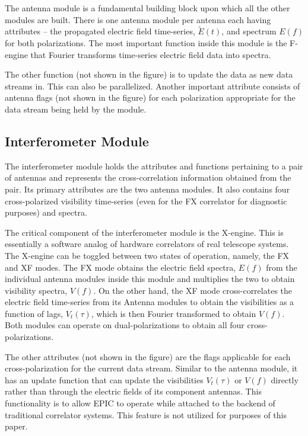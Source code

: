 \documentclass[a4paper,fleqn,usenatbib]{mnras}
\begin{document}
The antenna module is a fundamental building block upon which all the other modules are built. There is one antenna module per antenna each having attributes -- the propagated electric field time-series, $\widetilde{E}(t)$, and spectrum $E(f)$ for both polarizations. The most important function inside this module is the F-engine that Fourier transforms time-series electric field data into spectra. 

The other function (not shown in the figure) is to update the data as new data streams in. This can also be parallelized. Another important attribute consists of antenna flags (not shown in the figure) for each polarization appropriate for the data stream being held by the module. 

\subsection{Interferometer Module}

The interferometer module holds the attributes and functions pertaining to a pair of antennas and represents the cross-correlation information obtained from the pair. Its primary attributes are the two antenna modules. It also contains four cross-polarized visibility time-series (even for the FX correlator for diagnostic purposes) and spectra. 

The critical component of the interferometer module is the X-engine. This is essentially a software analog of hardware correlators of real telescope systems. The X-engine can be toggled between two states of operation, namely, the FX and XF modes. The FX mode obtains the electric field spectra, $E(f)$ from the individual antenna modules inside this module and multiplies the two to obtain visibility spectra, $V(f)$. On the other hand, the XF mode cross-correlates the electric field time-series from its Antenna modules to obtain the visibilities as a function of lags, $V_t(\tau)$, which is then Fourier transformed to obtain $V(f)$. Both modules can operate on dual-polarizations to obtain all four cross-polarizations.

The other attributes (not shown in the figure) are the flags applicable for each cross-polarization for the current data stream. Similar to the antenna module, it has an update function that can update the visibilities $V_t(\tau)$ or $V(f)$ directly rather than through the electric fields of its component antennas. This functionality is to allow EPIC to operate while attached to the backend of traditional correlator systems. This feature is not utilized for purposes of this paper.
\end{document}
